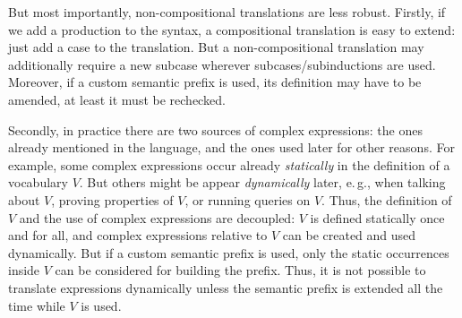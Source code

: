 But most importantly, non-compositional translations are less robust.
Firstly, if we add a production to the syntax, a compositional translation is easy to extend: just add a case to the translation.
But a non-compositional translation may additionally require a new subcase wherever subcases/subinductions are used.
Moreover, if a custom semantic prefix is used, its definition may have to be amended, at least it must be rechecked.

Secondly, in practice there are two sources of complex expressions: the ones already mentioned in the language, and the ones used later for other reasons.
For example, some complex expressions occur already \emph{statically} in the definition of a vocabulary $V$.
But others might be appear \emph{dynamically} later, e.\,g., when talking about $V$, proving properties of $V$, or running queries on $V$.
Thus, the definition of $V$ and the use of complex expressions are decoupled: $V$ is defined statically once and for all, and complex expressions relative to $V$ can be created and used dynamically.
But if a custom semantic prefix is used, only the static occurrences inside $V$ can be considered for building the prefix.
Thus, it is not possible to translate expressions dynamically unless the semantic prefix is extended all the time while $V$ is used.
